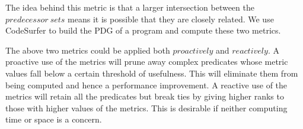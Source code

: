 The idea behind this metric is that a larger intersection between the $predecessor\ sets$ means it is possible that they are closely related.  We use CodeSurfer to build the PDG of a program and compute these two metrics.

The above two metrics could be applied both $proactively$ and $reactively$.  A proactive use of the metrics will prune away complex predicates whose metric values fall below a certain threshold of usefulness.  This will eliminate them from being computed and hence a performance improvement.  A reactive use of the metrics will retain all the predicates but break ties by giving higher ranks to those with higher values of the metrics. This is desirable if neither computing time or space is a concern.


